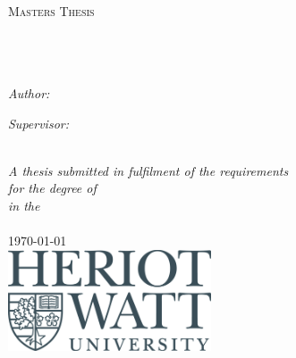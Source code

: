 \documentclass[11pt, oneside]{Thesis} %
\begin{document}
\begin{titlepage}
\begin{center}

\textsc{\LARGE \univname}\\[1.5cm] %
\textsc{\Large Masters Thesis}\\[0.5cm] %

\HRule \\[0.4cm] %
{\huge \bfseries \ttitle}\\[0.4cm] %
\HRule \\[1.5cm] %
 
\begin{minipage}{0.4\textwidth}
\begin{flushleft} \large
\emph{Author:}\\
\href{hb2017@hw.ac.uk}{\authornames} %
\end{flushleft}
\end{minipage}
\begin{minipage}{0.4\textwidth}
\begin{flushright} \large
\emph{Supervisor:} \\
\href{https://www.macs.hw.ac.uk/~ek19/}{\supname} %
\end{flushright}
\end{minipage}\\[3cm]
 
\large \textit{A thesis submitted in fulfilment of the requirements\\ for the degree of \degreename}\\[0.3cm] %
\textit{in the}\\[0.4cm]

\deptname\\[2cm] %
 
{\large \today}\\[1cm] %
\includegraphics[width=6cm]{./Figures/HWUlogo.jpg} %
 
\vfill
\end{center}

\end{titlepage}
\end{document}
